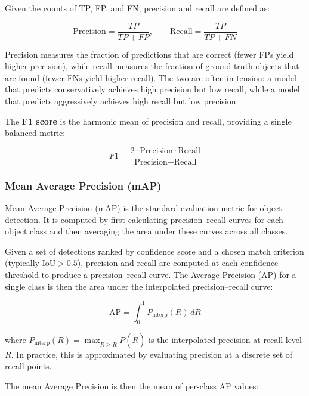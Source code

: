 Given the counts of TP, FP, and FN, precision and recall are defined as:

\begin{equation}
    \text{Precision} = \frac{TP}{TP + FP}, \qquad
    \text{Recall}    = \frac{TP}{TP + FN}
\end{equation}

Precision measures the fraction of predictions that are correct (fewer FPs yield higher precision), while recall measures the fraction of ground-truth objects that are found (fewer FNs yield higher recall). The two are often in tension: a model that predicts conservatively achieves high precision but low recall, while a model that predicts aggressively achieves high recall but low precision.

The \textbf{F1 score} is the harmonic mean of precision and recall, providing a single balanced metric:

\begin{equation}
    F1 = \frac{2 \cdot \text{Precision} \cdot \text{Recall}}{\text{Precision} + \text{Recall}}
\end{equation}

\subsubsection{Mean Average Precision (mAP)}

Mean Average Precision (mAP) is the standard evaluation metric for object detection. It is computed by first calculating precision--recall curves for each object class and then averaging the area under these curves across all classes.

Given a set of detections ranked by confidence score and a chosen match criterion (typically $\text{IoU} > 0.5$), precision and recall are computed at each confidence threshold to produce a precision--recall curve. The Average Precision (AP) for a single class is then the area under the interpolated precision--recall curve:

\begin{equation}
	\text{AP} = \int_0^1 P_{\text{interp}}(R) \, dR
\end{equation}

where $P_{\text{interp}}(R) = \max_{\tilde{R} \geq R} P(\tilde{R})$ is the interpolated precision at recall level $R$. In practice, this is approximated by evaluating precision at a discrete set of recall points.

The mean Average Precision is then the mean of per-class AP values:

